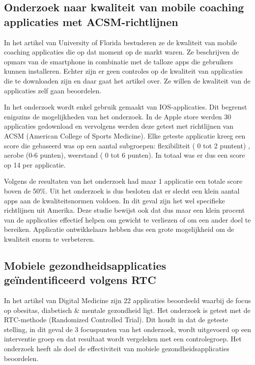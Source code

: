 \subsection{Onderzoek naar kwaliteit van mobile coaching applicaties met ACSM-richtlijnen}
\label{sec:onderzoek-ACSM-richtlijnen}

In het artikel van University of Florida \autocite{mhealth2015} bestuderen ze de kwaliteit van mobile coaching applicaties die op dat moment op de markt waren. Ze beschrijven de opmars van de smartphone in combinatie met de talloze apps die gebruikers kunnen installeren. Echter zijn er geen controles op de kwaliteit van applicaties die te downloaden zijn en daar gaat het artikel over. Ze willen de kwaliteit van de applicaties zelf gaan beoordelen.

In het onderzoek wordt enkel gebruik gemaakt van IOS-applicaties. Dit begrenst enigszins de mogelijkheden van het onderzoek. In de Apple store werden 30 applicaties gedownload en vervolgens werden deze getest met richtlijnen van ACSM (American College of Sports Medicine).
Elke geteste applicatie kreeg een score die gebaseerd was op een aantal subgroepen: flexibiliteit ( 0 tot 2 puntent) , aerobe (0-6 punten), weerstand ( 0 tot 6 punten). In totaal was er dus een score op 14 per applicatie.

Volgens de resultaten van het onderzoek had maar 1 applicatie een totale score boven de 50\%. Uit het onderzoek is dus besloten dat er slecht een klein aantal apps aan de kwaliteitsnormen voldoen. In dit geval zijn het wel specifieke richtlijnen uit Amerika. Deze studie bewijst ook dat dus maar een klein procent van de applicaties effectief helpen om gewicht te verliezen of om een ander doel te bereiken. Applicatie ontwikkelaars hebben dus een grote mogelijkheid om de kwaliteit enorm te verbeteren.

\subsection{Mobiele gezondheidsapplicaties geïndentificeerd volgens RTC}
\label{sec:onderzoek-RTC}

In het artikel van Digital Medicine \autocite{DigitalMedicine2015} zijn 22 applicaties beoordeeld waarbij de focus op obesitas, diabetisch \& mentale gezondheid ligt. Het onderzoek is getest met de RTC-methode (Randomized Controlled Trial). Dit houdt in dat de geteste stelling, in dit geval de 3 focuspunten van het onderzoek,  wordt uitgevoerd op een interventie groep en dat resultaat wordt vergeleken met een controlegroep. Het onderzoek heeft als doel de effectiviteit van mobiele gezondheidsapplicaties beoordelen.

